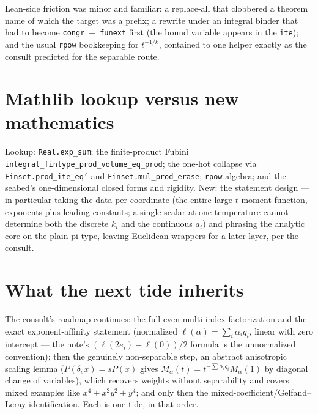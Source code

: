 \documentclass[11pt]{article}
\newcommand{\code}[1]{\texttt{#1}}
\begin{document}
Lean-side friction was minor and familiar: a replace-all that
clobbered a theorem name of which the target was a prefix; a
rewrite under an integral binder that had to become
\code{congr}~+~\code{funext} first (the bound variable appears in
the \code{ite}); and the usual \code{rpow} bookkeeping for
$t^{-1/k}$, contained to one helper exactly as the consult
predicted for the separable route.

\section{Mathlib lookup versus new mathematics}

Lookup: \code{Real.exp\_sum}; the finite-product Fubini
\code{integral\_fintype\_prod\_volume\_eq\_prod}; the one-hot
collapse via \code{Finset.prod\_ite\_eq'} and
\code{Finset.mul\_prod\_erase}; \code{rpow} algebra; and the
seabed's one-dimensional closed forms and rigidity. New: the
statement design --- in particular taking the data per coordinate
(the entire large-$t$ moment function, exponents plus leading
constants; a single scalar at one temperature cannot determine both
the discrete $k_i$ and the continuous $a_i$) and phrasing the
analytic core on the plain pi type, leaving Euclidean wrappers for a
later layer, per the consult.

\section{What the next tide inherits}

The consult's roadmap continues: the full even multi-index
factorization and the exact exponent-affinity statement (normalized
$\ell(\alpha) = \sum_i \alpha_i q_i$, linear with zero intercept ---
the note's $(\ell(2e_i) - \ell(0))/2$ formula is the unnormalized
convention); then the genuinely non-separable step, an abstract
anisotropic scaling lemma ($P(\delta_s x) = sP(x)$ gives
$M_\alpha(t) = t^{-\sum \alpha_i q_i} M_\alpha(1)$ by diagonal change
of variables), which recovers weights without separability and
covers mixed examples like $x^4 + x^2y^2 + y^4$; and only then the
mixed-coefficient/Gelfand--Leray identification. Each is one tide,
in that order.
\end{document}
